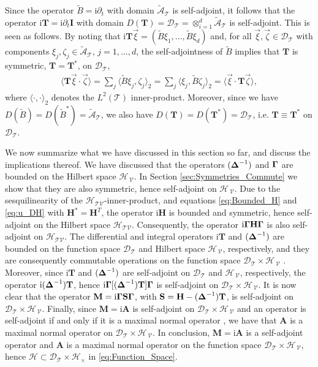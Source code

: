 \documentclass[11pt]{amsart}
\newcommand{\I}{\mathrm{i}}
\newcommand{\Mb}{\mathbf{M}}
\newcommand{\Tb}{\mathbf{T}}
\newcommand{\Hb}{\mathbf{H}}
\newcommand{\Ib}{\mathbf{I}}
\newcommand{\Sb}{\mathbf{S}}
\newcommand{\Ab}{\mathbf{A}}
\newcommand{\Tc}{\mathcal{T}}
\newcommand{\Vc}{\mathcal{V}}
\newcommand{\Hs}{\mathscr{H}}
\newcommand{\As}{\mathscr{A}}
\newcommand{\Ds}{\mathscr{D}}
\newcommand\bDelta{\mbox{\boldmath${\Delta}$}}
\newcommand\bGamma{\mbox{\boldmath${\Gamma}$}}
\begin{document}
Since the operator $\tilde{B}=\I\partial_t$ with domain $\tilde{\As}_{\Tc}$ is
self-adjoint, it follows that the operator $\I\Tb=\I\partial_t\Ib$ with domain
$D(\Tb)=\Ds_{\Tc}=\otimes_{i=1}^d\tilde{\As}_{\Tc}$ is self-adjoint. This is
seen as follows. By noting that
$\I\Tb\vec{\xi}=(\tilde{B}\xi_1,\ldots,\tilde{B}\xi_d)$ and, for all 
$\vec{\xi},\vec{\zeta}\in\Ds_{\Tc}$ with components
$\xi_j,\zeta_j\in\tilde{\As}_{\Tc}$, $j=1,\ldots,d$, the self-adjointness of 
$\tilde{B}$ implies that $\Tb$ is symmetric, $\Tb=\Tb^*$, on $\Ds_{\Tc}$, 
%
\begin{align}\label{eq:T_symmetric}
  \langle\Tb\vec{\xi}\cdot\vec{\zeta}\rangle=\sum_j\langle\tilde{B}\xi_j,\zeta_j\rangle_2
                    =\sum_j\langle\xi_j,\tilde{B}\zeta_j\rangle_2
                    =\langle\vec{\xi}\cdot\Tb\vec{\zeta}\rangle,
\end{align}
%
where $\langle\cdot,\cdot\rangle_2$ denotes the $L^2(\Tc)$ inner-product.  Moreover, since we have
$D(\tilde{B})=D(\tilde{B}^*)=\tilde{\As}_{\Tc}$, we also have
$D(\Tb)=D(\Tb^*)=\Ds_{\Tc}$, i.e. $\Tb\equiv\Tb^*$ on $\Ds_{\Tc}$. 



We now summarize what we have discussed in this section so far, and
discuss the implications thereof. We have discussed that the 
operators $(\bDelta^{-1})$ and $\bGamma$ are bounded on the Hilbert
space $\Hs_{\,\Vc}$. In Section \ref{sec:Symmetries_Commute} we show
that they are also symmetric, hence self-adjoint on $\Hs_{\,\Vc}$. Due
to the sesquilinearity of the $\Hs_{\Tc\Vc}$-inner-product, and
equations \eqref{eq:Bounded_H} and \eqref{eq:u_DH} with $\Hb^*=\Hb^T$,
the  operator $\I\Hb$ is bounded and symmetric, hence self-adjoint on
the Hilbert space $\Hs_{\Tc\Vc}$.  Consequently, the operator
$\I\bGamma\Hb\bGamma$ is also self-adjoint on $\Hs_{\Tc\Vc}$. The
differential and integral operators $\I\Tb$ and $(\bDelta^{-1})$ are 
bounded on the function space $\Ds_{\Tc}$ and Hilbert space $\Hs_{\,\Vc}$,
respectively, and they are consequently commutable operations on the
function space $\Ds_{\Tc}\times\Hs_{\,\Vc}$ \cite{Folland:99}. Moreover,
since $\I\Tb$ and $(\bDelta^{-1})$ are self-adjoint on $\Ds_{\Tc}$ and
$\Hs_{\,\Vc}$, respectively, the operator $\I(\bDelta^{-1})\Tb$, hence 
$\I\bGamma[(\bDelta^{-1})\Tb]\bGamma$ is self-adjoint on
$\Ds_{\Tc}\times\Hs_{\,\Vc}$. It is now clear that the operator
$\Mb=\I\bGamma\Sb\bGamma$, with $\Sb=\Hb-(\bDelta^{-1})\Tb$, is
self-adjoint on $\Ds_{\Tc}\times\Hs_{\,\Vc}$. Finally, since $\Mb=\I\Ab$ is
self-adjoint on $\Ds_{\Tc}\times\Hs_{\,\Vc}$ and an operator is
self-adjoint if and only if it is a maximal normal operator
\cite{Stone:64}, we have that $\Ab$ is a maximal normal
operator on $\Ds_{\Tc}\times\Hs_{\,\Vc}$. In conclusion, $\Mb=\I\Ab$ is a
self-adjoint operator and $\Ab$ is a  maximal normal operator on
the function space $\Ds_{\Tc}\times\Hs_{\,\Vc}$, hence
$\Hs\subset\Ds_{\Tc}\times\Hs_\times$ in \eqref{eq:Function_Space}.     
\end{document}
